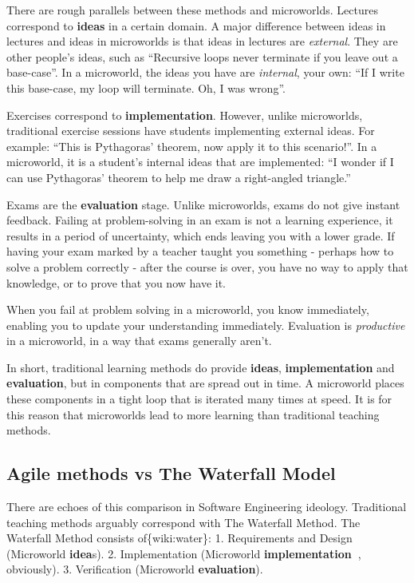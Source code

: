 There are rough parallels between these methods and microworlds.
Lectures correspond to \textbf{ideas} in a certain domain. A major
difference between ideas in lectures and ideas in microworlds is that
ideas in lectures are \emph{external}. They are other people's ideas,
such as ``Recursive loops never terminate if you leave out a
base-case''. In a microworld, the ideas you have are \emph{internal},
your own: ``If I write this base-case, my loop will terminate. Oh, I was
wrong''.

Exercises correspond to \textbf{implementation}. However, unlike
microworlds, traditional exercise sessions have students implementing
external ideas. For example: ``This is Pythagoras' theorem, now apply it
to this scenario!''. In a microworld, it is a student's internal ideas
that are implemented: ``I wonder if I can use Pythagoras' theorem to
help me draw a right-angled triangle.''

Exams are the \textbf{evaluation} stage. Unlike microworlds, exams do
not give instant feedback. Failing at problem-solving in an exam is not
a learning experience, it results in a period of uncertainty, which ends
leaving you with a lower grade. If having your exam marked by a teacher
taught you something - perhaps how to solve a problem correctly - after
the course is over, you have no way to apply that knowledge, or to prove
that you now have it.

When you fail at problem solving in a microworld, you know immediately,
enabling you to update your understanding immediately. Evaluation is
\emph{productive} in a microworld, in a way that exams generally aren't.

In short, traditional learning methods do provide \textbf{ideas},
\textbf{implementation} and \textbf{evaluation}, but in components that
are spread out in time. A microworld places these components in a tight
loop that is iterated many times at speed. It is for this reason that
microworlds lead to more learning than traditional teaching methods.

\subsection{Agile methods vs The Waterfall Model}

There are echoes of this comparison in Software Engineering ideology.
Traditional teaching methods arguably correspond with The Waterfall
Method. The Waterfall Method consists of\{wiki:water\}: 1. Requirements
and Design (Microworld \textbf{idea}s). 2. Implementation (Microworld
\textbf{implementation~}, obviously). 3. Verification (Microworld
\textbf{evaluation}).

